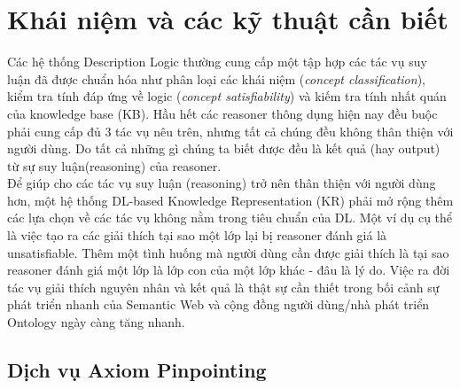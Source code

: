 \section{Khái niệm và các kỹ thuật cần biết}
Các hệ thống Description Logic thường cung cấp một tập hợp các tác vụ suy luận đã được chuẩn hóa như phân loại các khái niệm (\textit{concept classification}), kiểm tra tính đáp ứng về logic (\textit{concept satisfiability}) và kiếm tra tính nhất quán của knowledge base (KB). Hầu hết các reasoner thông dụng hiện nay đều buộc phải cung cấp đủ 3 tác vụ nêu trên, nhưng tất cả chúng đều không thân thiện với người dùng. Do tất cả những gì chúng ta biết được đều là kết quả (hay output) từ sự suy luận(reasoning) của reasoner. 
\\
\hspace*{0.05\textwidth}  Để giúp cho các tác vụ suy luận (reasoning) trở nên thân thiện với người dùng hơn, một hệ thống DL-based Knowledge Representation (KR) phải mở rộng thêm các lựa chọn về các tác vụ không nằm trong tiêu chuẩn của DL. Một ví dụ cụ thể là việc tạo ra các giải thích tại sao một lớp lại bị reasoner đánh giá là unsatisfiable. Thêm một tình huống mà người dùng cần được giải thích là tại sao reasoner đánh giá một lớp là lớp con của một lớp khác - đâu là lý do. Việc ra đời tác vụ giải thích nguyên nhân và kết quả là thật sự cần thiết trong bối cảnh sự phát triển nhanh của Semantic Web và cộng đồng người dùng/nhà phát triển Ontology ngày càng tăng nhanh.
\subsection{Dịch vụ Axiom Pinpointing}
